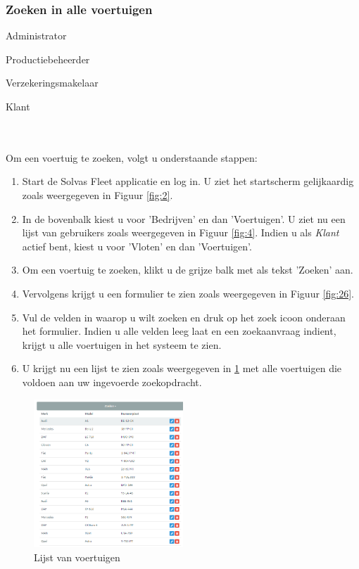 \documentclass[11pt,openany]{article}
\newcommand{\cmark}{\ding{51}}%
\newcommand{\done}{\rlap{$\square$}{\raisebox{2pt}{\large\hspace{1pt}\cmark}}%
	\hspace{-2.5pt}}
\begin{document}
\subsubsection{Zoeken in alle voertuigen}
\begin{todolist}
	\item[\done] Administrator
	\item[\done] Productiebeheerder
	\item[\done] Verzekeringsmakelaar
	\item[\done] Klant 
\end{todolist}
\\
\\
Om een voertuig te zoeken, volgt u onderstaande stappen:
\begin{enumerate}
		\item Start de Solvas Fleet applicatie en log in. U ziet het startscherm gelijkaardig zoals weergegeven in Figuur \ref{fig:2}.
	\item In de bovenbalk kiest u voor 'Bedrijven' en dan 'Voertuigen'. U ziet nu een lijst van gebruikers zoals weergegeven in Figuur \ref{fig:4}. Indien u als \textit{Klant} actief bent, kiest u voor 'Vloten' en dan 'Voertuigen'.
	\item Om een voertuig te zoeken, klikt u de grijze balk met als tekst 'Zoeken' aan. 
	\item Vervolgens krijgt u een formulier te zien zoals weergegeven in Figuur \ref{fig:26}.
	\item Vul de velden in waarop u wilt zoeken en druk op het zoek icoon onderaan het formulier. Indien u alle velden leeg laat en een zoekaanvraag indient, krijgt u alle voertuigen in het systeem te zien.
	\item U krijgt nu een lijst te zien zoals weergegeven in \ref{fig:29} met alle voertuigen die voldoen aan uw ingevoerde zoekopdracht.
\end{enumerate}


\begin{figure}
	\centering
	\includegraphics[width=0.5\textwidth]{img/fig29.png}
	\caption{Lijst van voertuigen} 
	\label{fig:29} 
\end{figure}
\end{document}
